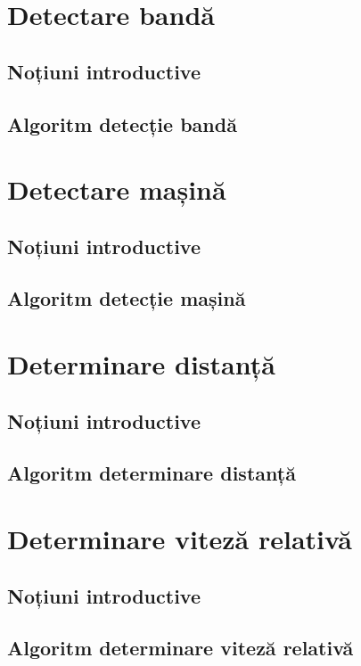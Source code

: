 \section{Detectare bandă}
\subsection{Noțiuni introductive}
\subsection{Algoritm detecție bandă}

\section{Detectare mașină}
\subsection{Noțiuni introductive}
\subsection{Algoritm detecție mașină}

\section{Determinare distanță}
\subsection{Noțiuni introductive}
\subsection{Algoritm determinare distanță}

\section{Determinare viteză relativă}
\subsection{Noțiuni introductive}
\subsection{Algoritm determinare viteză relativă}